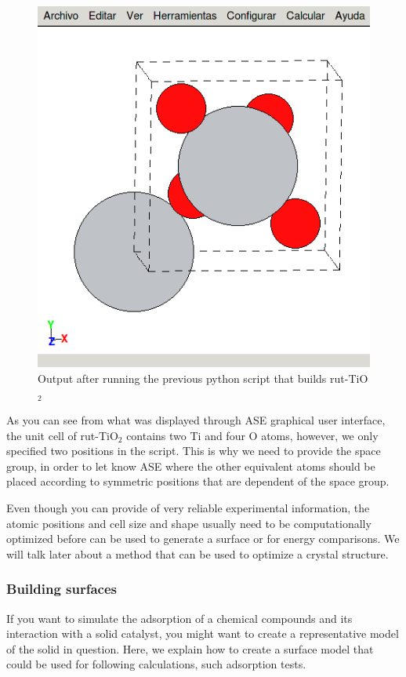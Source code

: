 \documentclass[11pt]{article}
\begin{document}
\begin{figure}[htb]
\centering
\includegraphics[width=.9\linewidth]{./figures/rut-TiO2_ase_ex.png}
\caption{Output after running the previous python script that builds rut-TiO$_{\text{2}}$}
\end{figure}

As you can see from what was displayed through ASE graphical user interface, the unit cell of rut-TiO$_{\text{2}}$ contains two Ti and four O atoms, however, we only specified two positions in the script. This is why we need to provide the space group, in order to let know ASE where the other equivalent atoms should be placed according to symmetric positions that are dependent of the space group.

Even though you can provide of very reliable experimental information, the atomic positions and cell size and shape usually need to be computationally optimized before can be used to generate a surface or for energy comparisons. We will talk later about a method that can be used to optimize a crystal structure.  

\subsubsection{Building surfaces}
\label{sec-2-3-5}
If you want to simulate the adsorption of a chemical compounds and its interaction with a solid catalyst, you might want to create a representative model of the solid in question. Here, we explain how to create a surface model that could be used for following calculations, such adsorption tests. 
\end{document}
